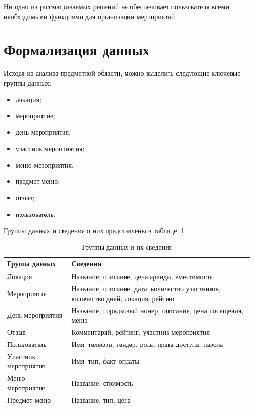 Ни одно из рассматриваемых решений не обеспечивает пользователя всеми необходимыми функциями для организации мероприятий.

\section{Формализация данных}

Исходя из анализа предметной области, можно выделить следующие ключевые группы данных:
\begin{itemize}[label=--]
	\item локация;
	\item мероприятие;
	\item день мероприятия;
	\item участник мероприятия;
	\item меню мероприятия;
	\item предмет меню;
	\item отзыв;
	\item пользователь.
\end{itemize}

Группы данных и сведения о них представлены в таблице~\ref{tbl:data-groups}

\begin{table}[h]
	\centering
	\caption{Группы данных и их сведения}
	\begin{tabularx}{\textwidth}{|X|X|}
		\hline
		\textbf{Группа данных} & \textbf{Сведения} \\
		\hline
		Локация & Название, описание, цена аренды, вместимость \\
		\hline
		Мероприятие & Название, описание, дата, количество участников, количество дней, локация, рейтинг \\
		\hline
		День мероприятия & Название, порядковый номер, описание, цена посещения, меню \\
		\hline
		Отзыв & Комментарий, рейтинг, участник мероприятия \\
		\hline
		Пользователь & Имя, телефон, гендер, роль, права доступа, пароль \\
		\hline
		Участник мероприятия & Имя, тип, факт оплаты \\
		\hline
		Меню мероприятия & Название, стоимость \\
		\hline
		Предмет меню & Название, тип, цена \\
		\hline
	\end{tabularx}
	\label{tbl:data-groups}
\end{table}

